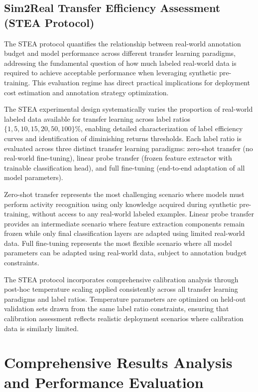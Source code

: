 \documentclass[journal]{IEEEtran}
\begin{document}
\subsection{Sim2Real Transfer Efficiency Assessment (STEA Protocol)}

The STEA protocol quantifies the relationship between real-world annotation budget and model performance across different transfer learning paradigms, addressing the fundamental question of how much labeled real-world data is required to achieve acceptable performance when leveraging synthetic pre-training. This evaluation regime has direct practical implications for deployment cost estimation and annotation strategy optimization.

The STEA experimental design systematically varies the proportion of real-world labeled data available for transfer learning across label ratios $\{1, 5, 10, 15, 20, 50, 100\}\%$, enabling detailed characterization of label efficiency curves and identification of diminishing returns thresholds. Each label ratio is evaluated across three distinct transfer learning paradigms: zero-shot transfer (no real-world fine-tuning), linear probe transfer (frozen feature extractor with trainable classification head), and full fine-tuning (end-to-end adaptation of all model parameters).

Zero-shot transfer represents the most challenging scenario where models must perform activity recognition using only knowledge acquired during synthetic pre-training, without access to any real-world labeled examples. Linear probe transfer provides an intermediate scenario where feature extraction components remain frozen while only final classification layers are adapted using limited real-world data. Full fine-tuning represents the most flexible scenario where all model parameters can be adapted using real-world data, subject to annotation budget constraints.

The STEA protocol incorporates comprehensive calibration analysis through post-hoc temperature scaling applied consistently across all transfer learning paradigms and label ratios. Temperature parameters are optimized on held-out validation sets drawn from the same label ratio constraints, ensuring that calibration assessment reflects realistic deployment scenarios where calibration data is similarly limited.

\section{Comprehensive Results Analysis and Performance Evaluation}
\end{document}
